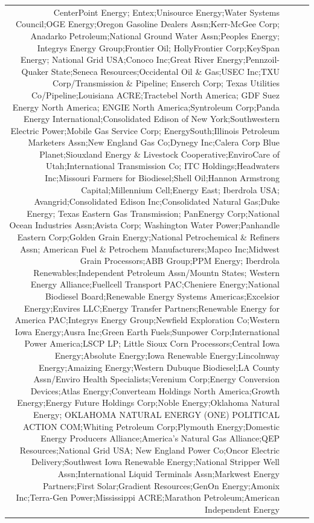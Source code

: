 \documentclass[]{article}
\begin{document}
\begin{longtable}[]{@{}rlrl@{}}
CenterPoint Energy; Entex;Unisource Energy;Water Systems Council;OGE
Energy;Oregon Gasoline Dealers Assn;Kerr-McGee Corp; Anadarko
Petroleum;National Ground Water Assn;Peoples Energy; Integrys Energy
Group;Frontier Oil; HollyFrontier Corp;KeySpan Energy; National Grid
USA;Conoco Inc;Great River Energy;Pennzoil-Quaker State;Seneca
Resources;Occidental Oil \& Gas;USEC Inc;TXU Corp/Transmission \&
Pipeline; Enserch Corp; Texas Utilities Co/Pipeline;Louisiana
ACRE;Tractebel North America; GDF Suez Energy North America; ENGIE North
America;Syntroleum Corp;Panda Energy International;Consolidated Edison
of New York;Southwestern Electric Power;Mobile Gas Service Corp;
EnergySouth;Illinois Petroleum Marketers Assn;New England Gas Co;Dynegy
Inc;Calera Corp Blue Planet;Siouxland Energy \& Livestock
Cooperative;EnviroCare of Utah;International Transmission Co; ITC
Holdings;Headwaters Inc;Missouri Farmers for Biodiesel;Shell Oil;Hannon
Armstrong Capital;Millennium Cell;Energy East; Iberdrola USA;
Avangrid;Consolidated Edison Inc;Consolidated Natural Gas;Duke Energy;
Texas Eastern Gas Transmission; PanEnergy Corp;National Ocean Industries
Assn;Avista Corp; Washington Water Power;Panhandle Eastern Corp;Golden
Grain Energy;National Petrochemical \& Refiners Assn; American Fuel \&
Petrochem Manufacturers;Mapco Inc;Midwest Grain Processors;ABB Group;PPM
Energy; Iberdrola Renewables;Independent Petroleum Assn/Mountn States;
Western Energy Alliance;Fuellcell Transport PAC;Cheniere Energy;National
Biodiesel Board;Renewable Energy Systems Americas;Excelsior
Energy;Envires LLC;Energy Transfer Partners;Renewable Energy for America
PAC;Integrys Energy Group;Newfield Exploration Co;Western Iowa
Energy;Ausra Inc;Green Earth Fuels;Sunpower Corp;International Power
America;LSCP LP; Little Sioux Corn Processors;Central Iowa
Energy;Absolute Energy;Iowa Renewable Energy;Lincolnway Energy;Amaizing
Energy;Western Dubuque Biodiesel;LA County Assn/Enviro Health
Specialists;Verenium Corp;Energy Conversion Devices;Atlas
Energy;Converteam Holdings North America;Growth Energy;Energy Future
Holdings Corp;Noble Energy;Oklahoma Natural Energy; OKLAHOMA NATURAL
ENERGY (ONE) POLITICAL ACTION COM;Whiting Petroleum Corp;Plymouth
Energy;Domestic Energy Producers Alliance;America's Natural Gas
Alliance;QEP Resources;National Grid USA; New England Power Co;Oncor
Electric Delivery;Southwest Iowa Renewable Energy;National Stripper Well
Assn;International Liquid Terminals Assn;Markwest Energy Partners;First
Solar;Gradient Resources;GenOn Energy;Amonix Inc;Terra-Gen
Power;Mississippi ACRE;Marathon Petroleum;American Independent Energy

\end{longtable}
\end{document}
